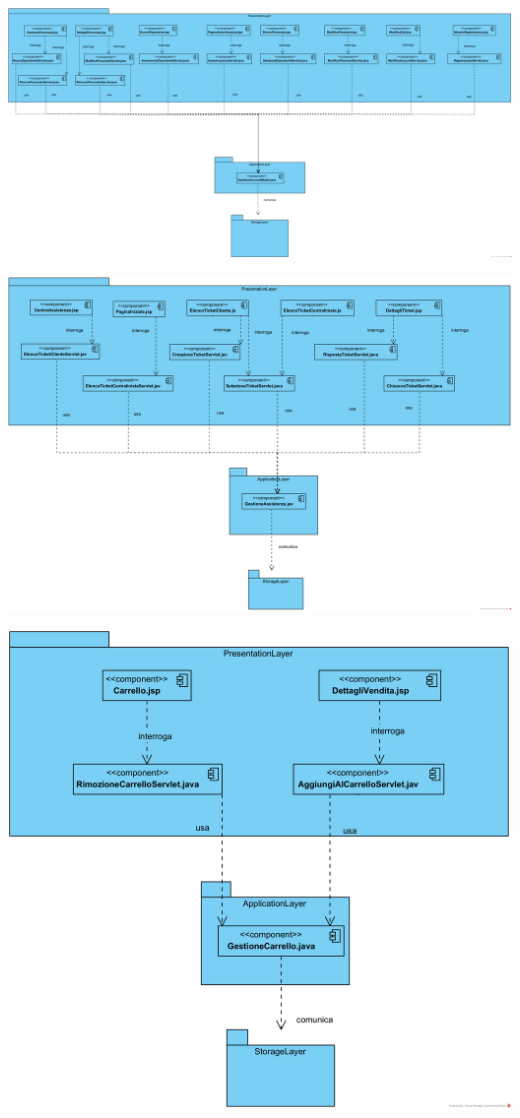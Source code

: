 \documentclass[12pt,a4paper]{article}
\begin{document}
\newpage

\begin{center}
\includegraphics[width=\textwidth]{GestioneAccount}
\end{center}

\begin{center}
\includegraphics[width=\textwidth]{GestioneAssistenza}
\end{center}

\begin{center}
\includegraphics[width=\textwidth]{GestioneCarrello}
\end{center}
\end{document}

